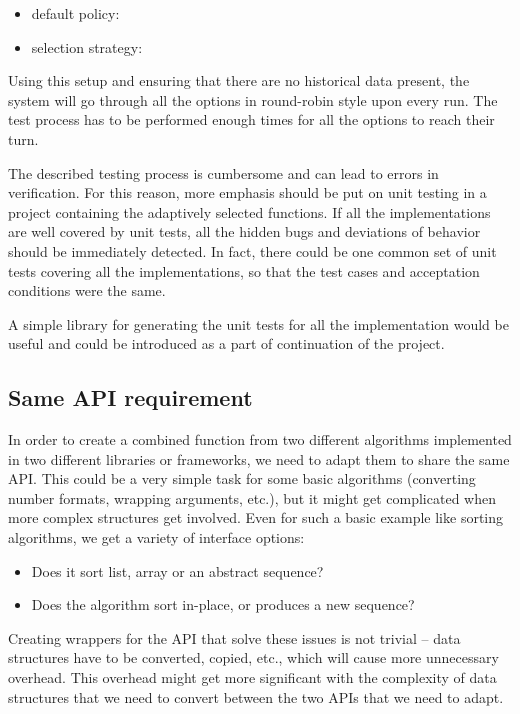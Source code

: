  \begin{itemize}
 	\item default policy: 
 	\item selection strategy: 
 \end{itemize}

Using this setup and ensuring that there are no historical data present, the system will go through all the options in round-robin style upon every run. The test process has to be performed enough times for all the options to reach their turn.

The described testing process is cumbersome and can lead to errors in verification. For this reason, more emphasis should be put on unit testing in a project containing the adaptively selected functions. If all the implementations are well covered by unit tests, all the hidden bugs and deviations of behavior should be immediately detected. In fact, there could be one common set of unit tests covering all the implementations, so that the test cases and acceptation conditions were the same.

A simple library for generating the unit tests for all the implementation would be useful and could be introduced as a part of continuation of the project.

\subsection{Same API requirement}

In order to create a combined function from two different algorithms implemented in two different libraries or frameworks, we need to adapt them to share the same API. This could be a very simple task for some basic algorithms (converting number formats, wrapping arguments, etc.), but it might get complicated when more complex structures get involved. Even for such a basic example like sorting algorithms, we get a variety of interface options:

\begin{itemize}
	\item Does it sort list, array or an abstract sequence?
	\item Does the algorithm sort in-place, or produces a new sequence?
\end{itemize}

Creating wrappers for the API that solve these issues is not trivial -- data structures have to be converted, copied, etc., which will cause more unnecessary overhead. This overhead might get more significant with the complexity of data structures that we need to convert between the two APIs that we need to adapt.